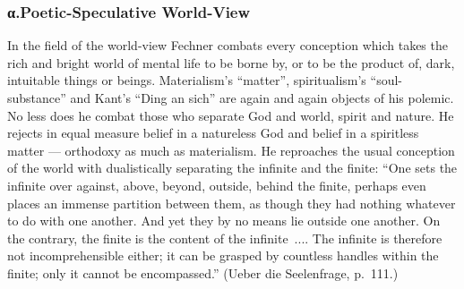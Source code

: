 \documentclass[12pt,a4paper]{book}
\begin{document}
\subsubsection*{α.\quad Poetic-Speculative World-View}

In the field of the world-view Fechner combats every conception which takes the
rich and bright world of mental life to be borne by, or to be the product of,
dark, intuitable things or beings. Materialism's ``matter'', spiritualism's
``soul-substance'' and Kant's ``Ding an sich'' are again and again objects of his
polemic. No less does he combat those who separate God and world, spirit and
nature. He rejects in equal measure belief in a natureless God and belief in a
spiritless matter --- orthodoxy as much as materialism. He reproaches the usual
conception of the world with dualistically separating the infinite and the
finite: ``One sets the infinite over against, above, beyond, outside, behind the
finite, perhaps even places an immense partition between them, as though they had
nothing whatever to do with one another. And yet they by no means lie outside one
another. On the contrary, the finite is the content of the infinite~.... The
infinite is therefore not incomprehensible either; it can be grasped by countless
handles within the finite; only it cannot be encompassed.'' (Ueber die
Seelenfrage, p.~111.)
\end{document}
